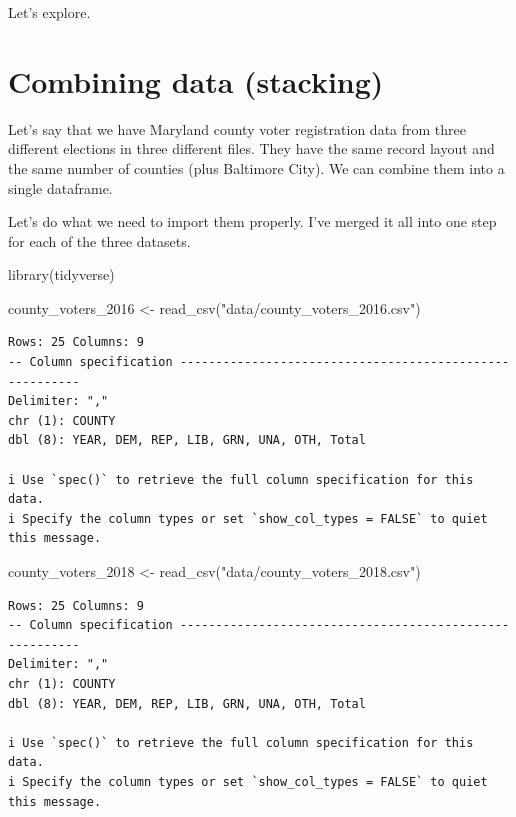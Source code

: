 \documentclass[
  letterpaper,
  DIV=11,
  numbers=noendperiod]{scrreprt}
\newenvironment{Shaded}{\begin{snugshade}}{\end{snugshade}}
\newcommand{\FunctionTok}[1]{\textcolor[rgb]{0.28,0.35,0.67}{#1}}
\newcommand{\NormalTok}[1]{\textcolor[rgb]{0.00,0.23,0.31}{#1}}
\newcommand{\OtherTok}[1]{\textcolor[rgb]{0.00,0.23,0.31}{#1}}
\newcommand{\StringTok}[1]{\textcolor[rgb]{0.13,0.47,0.30}{#1}}
\begin{document}
Let's explore.

\hypertarget{combining-data-stacking}{%
\section{Combining data (stacking)}\label{combining-data-stacking}}

Let's say that we have Maryland county voter registration data from
three different elections in three different files. They have the same
record layout and the same number of counties (plus Baltimore City). We
can combine them into a single dataframe.

Let's do what we need to import them properly. I've merged it all into
one step for each of the three datasets.

\begin{Shaded}
\begin{Highlighting}[]
\FunctionTok{library}\NormalTok{(tidyverse)}
\end{Highlighting}
\end{Shaded}

\begin{Shaded}
\begin{Highlighting}[]
\NormalTok{county\_voters\_2016 }\OtherTok{\textless{}{-}} \FunctionTok{read\_csv}\NormalTok{(}\StringTok{"data/county\_voters\_2016.csv"}\NormalTok{)}
\end{Highlighting}
\end{Shaded}

\begin{verbatim}
Rows: 25 Columns: 9
-- Column specification --------------------------------------------------------
Delimiter: ","
chr (1): COUNTY
dbl (8): YEAR, DEM, REP, LIB, GRN, UNA, OTH, Total

i Use `spec()` to retrieve the full column specification for this data.
i Specify the column types or set `show_col_types = FALSE` to quiet this message.
\end{verbatim}

\begin{Shaded}
\begin{Highlighting}[]
\NormalTok{county\_voters\_2018 }\OtherTok{\textless{}{-}} \FunctionTok{read\_csv}\NormalTok{(}\StringTok{"data/county\_voters\_2018.csv"}\NormalTok{)}
\end{Highlighting}
\end{Shaded}

\begin{verbatim}
Rows: 25 Columns: 9
-- Column specification --------------------------------------------------------
Delimiter: ","
chr (1): COUNTY
dbl (8): YEAR, DEM, REP, LIB, GRN, UNA, OTH, Total

i Use `spec()` to retrieve the full column specification for this data.
i Specify the column types or set `show_col_types = FALSE` to quiet this message.
\end{verbatim}
\end{document}
